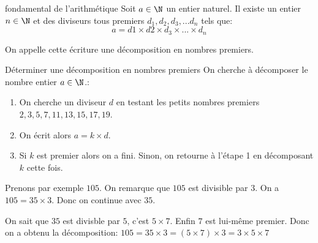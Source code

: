 \begin{theo}{fondamental de l'arithmétique}{}
	Soit $a\in\N$ un entier naturel. Il existe un entier $n\in\N$ et des diviseurs tous premiers $d_1, d_2, d_3, ... d_n$ tels que:
	$$a=d1\times d2 \times d_3 \times ...\times d_n$$

	On appelle cette écriture une décomposition en nombres premiers.
\end{theo}


\begin{methode}{Déterminer une décomposition en nombres premiers}{}
	On cherche à décomposer le nombre entier $a\in\N$.:
	\begin{enumerate}
		\item On cherche un diviseur $d$ en testant les petits nombres premiers $2,3,5,7,11,13,15,17,19$.
		\item On écrit alors $a=k\times d$.
		\item Si $k$ est premier alors on a fini. Sinon, on retourne à l'étape 1 en décomposant $k$ cette fois.
	\end{enumerate}
\end{methode}

\begin{ex}{}{}
	Prenons par exemple $105$. On remarque que $105$ est divisible par $3$. On a $105 = 35\times3$. Donc on continue avec $35$.
	
	On sait que $35$ est divisble par $5$, c'est $5\times7$. Enfin 	$7$ est lui-même premier. Donc on a obtenu la décomposition:
	$105=35\times3 = (5\times7)\times3 = 3\times5\times7$
\end{ex}

